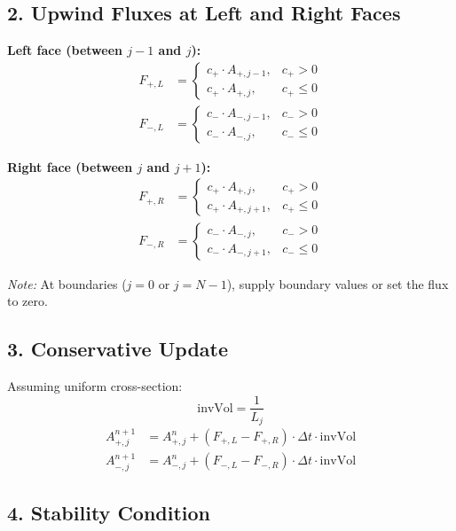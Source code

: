 \subsection*{2. Upwind Fluxes at Left and Right Faces}

\textbf{Left face (between $j-1$ and $j$):}
\begin{align*}
F_{+,L} &= 
\begin{cases}
c_+ \cdot A_{+,j-1}, & c_+ > 0 \\
c_+ \cdot A_{+,j},   & c_+ \leq 0
\end{cases} \\
F_{-,L} &= 
\begin{cases}
c_- \cdot A_{-,j-1}, & c_- > 0 \\
c_- \cdot A_{-,j},   & c_- \leq 0
\end{cases}
\end{align*}

\textbf{Right face (between $j$ and $j+1$):}
\begin{align*}
F_{+,R} &= 
\begin{cases}
c_+ \cdot A_{+,j},   & c_+ > 0 \\
c_+ \cdot A_{+,j+1}, & c_+ \leq 0
\end{cases} \\
F_{-,R} &= 
\begin{cases}
c_- \cdot A_{-,j},   & c_- > 0 \\
c_- \cdot A_{-,j+1}, & c_- \leq 0
\end{cases}
\end{align*}

\textit{Note:} At boundaries ($j = 0$ or $j = N - 1$), supply boundary values or set the flux to zero.

\subsection*{3. Conservative Update}

Assuming uniform cross-section:
\[
\text{invVol} = \frac{1}{L_j}
\]
\begin{align*}
A_{+,j}^{n+1} &= A_{+,j}^{n} + \left(F_{+,L} - F_{+,R}\right) \cdot \Delta t \cdot \text{invVol} \\
A_{-,j}^{n+1} &= A_{-,j}^{n} + \left(F_{-,L} - F_{-,R}\right) \cdot \Delta t \cdot \text{invVol}
\end{align*}

\subsection*{4. Stability Condition}

